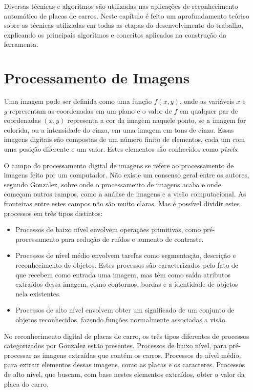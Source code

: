 Diversas técnicas e algoritmos são utilizadas nas aplicações de reconhecimento automático de placas de carros. Neste capítulo é feito um aprofundamento teórico sobre as técnicas utilizadas em todas as etapas do desenvolvimento do trabalho, explicando os principais algoritmos e conceitos aplicados na construção da ferramenta.

\section{Processamento de Imagens}
\label{sec:processamentoimagens}

Uma imagem pode ser definida como uma função $f(x, y)$, onde as variáveis $x$ e $y$ representam as coordenadas em um plano e o valor de $f$ em qualquer par de coordenadas $(x, y)$ representa a cor da imagem naquele ponto, se a imagem for colorida, ou a intensidade do cinza, em uma imagem em tons de cinza. Essas imagens digitais são compostas de um número finito de elementos, cada um com uma posição diferente e um valor. Estes elementos são conhecidos como \emph{pixels}.\cite{gonzalez1977digital}

O campo do processamento digital de imagens se refere ao processamento de imagens feito por um computador. Não existe um consenso geral entre os autores, segundo Gonzalez\cite{gonzalez1977digital}, sobre onde o processamento de imagens acaba e onde começam outros campos, como a análise de imagens e a visão computacional. As fronteiras entre estes campos não são muito claras. Mas é possível dividir estes processos em três tipos distintos:

\begin{itemize}
	\item Processos de baixo nível envolvem operações primitivas, como pré-processamento para redução de ruídos e aumento de contraste.
    \item Processos de nível médio envolvem tarefas como segmentação, descrição e reconhecimento de objetos. Estes processos são caracterizados pelo fato de que recebem como entrada uma imagem, mas têm como saída atributos extraídos dessa imagem, como contornos, bordas e a identidade de objetos nela existentes.
    \item Processos de alto nível envolvem obter um significado de um conjunto de objetos reconhecidos, fazendo funções normalmente associadas a visão.
\end{itemize}

No reconhecimento digital de placas de carro, os três tipos diferentes de processos categorizados por Gonzalez\cite{gonzalez1977digital} estão presentes. Processos de baixo nível, para pré-processar as imagens extraídas que contém os carros. Processos de nível médio, para extrair elementos dessas imagens, como as placas e os caracteres. Processos de alto nível, que buscam, com base nestes elementos extraídos, obter o valor da placa do carro.

